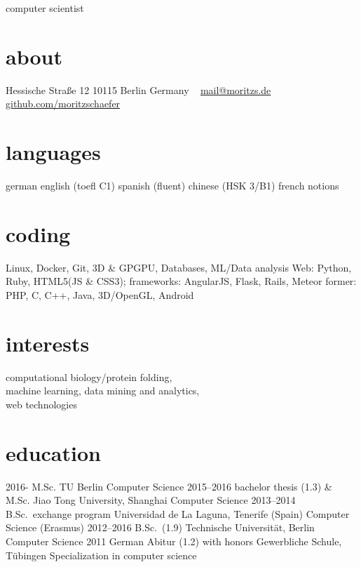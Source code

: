 \documentclass[]{friggeri-cv}
\begin{document}
       {computer scientist}


\begin{aside}
  \section{about}
    Hessische Straße 12
    10115 Berlin
    Germany
    ~
    \href{mailto:mail@moritz.de}{mail@moritzs.de}
    \href{https://github.com/moritzschaefer}{github.com/moritzschaefer}
  \section{languages}
    german
    english (toefl C1)
    spanish (fluent)
    chinese (HSK 3/B1)
    french notions
  \section{coding}
    Linux, Docker, Git, 3D \& GPGPU, Databases, ML/Data analysis
    Web:
    Python, Ruby,
    HTML5(JS \& CSS3); frameworks: AngularJS, Flask, Rails, Meteor
    former:
    PHP, C, C++, Java, 3D/OpenGL, Android
\end{aside}


\section{interests}

computational biology/protein folding, \\
machine learning, data mining and analytics, \\
web technologies%

\section{education}

\begin{entrylist}
  \entry
    {2016-}
    {M.Sc.}
    {TU Berlin}
    {Computer Science}
  \entry
    {2015–2016}
    {bachelor thesis (1.3) \& M.Sc.}
    {Jiao Tong University, Shanghai}
    {Computer Science}
  \entry
    {2013–2014}
    {B.Sc.\ exchange program}
    {Universidad de La Laguna, Tenerife (Spain)}
    {Computer Science (Erasmus)}
  \entry
    {2012–2016}
    {B.Sc.\ (1.9)}
    {Technische Universität, Berlin}
    {Computer Science}
  \entry
    {2011}
    {German Abitur (1.2) with honors}
    {Gewerbliche Schule, Tübingen}
    {Specialization in computer science}
\end{entrylist}
\end{document}
